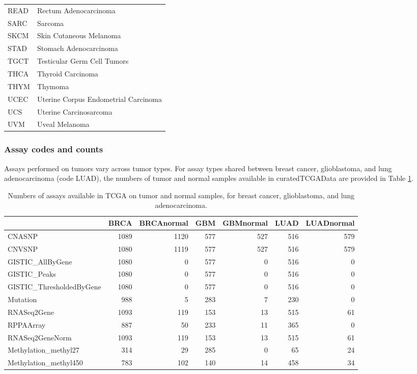 \documentclass[graybox]{svmult}
\begin{document}
\begin{table}
\begin{tabular}[t]{ll}
READ & Rectum Adenocarcinoma\\
SARC & Sarcoma\\
SKCM & Skin Cutaneous Melanoma\\
\addlinespace
STAD & Stomach Adenocarcinoma\\
TGCT & Testicular Germ Cell Tumors\\
THCA & Thyroid Carcinoma\\
THYM & Thymoma\\
UCEC & Uterine Corpus Endometrial Carcinoma\\
\addlinespace
UCS & Uterine Carcinosarcoma\\
UVM & Uveal Melanoma\\
\bottomrule
\end{tabular}
\end{table}


\subsubsection{Assay codes and counts}\label{assay-codes-and-counts}

Assays performed on tumors vary across tumor types. For assay
types shared between
breast cancer, glioblastoma, and lung adenocarcinoma (code LUAD),
the numbers of tumor and normal samples available in curatedTCGAData
are provided in Table \ref{tab:tab-doassc}.

\begin{table}

\caption{\label{tab:tab-doassc}Numbers of assays available in TCGA on tumor and normal samples,
for breast cancer, glioblastoma, and lung adenocarcinoma.}
\centering
\begin{tabular}[t]{lrrrrrr}
\toprule
  & BRCA & BRCAnormal & GBM & GBMnormal & LUAD & LUADnormal\\
\midrule
CNASNP & 1089 & 1120 & 577 & 527 & 516 & 579\\
CNVSNP & 1080 & 1119 & 577 & 527 & 516 & 579\\
GISTIC\_AllByGene & 1080 & 0 & 577 & 0 & 516 & 0\\
GISTIC\_Peaks & 1080 & 0 & 577 & 0 & 516 & 0\\
GISTIC\_ThresholdedByGene & 1080 & 0 & 577 & 0 & 516 & 0\\
\addlinespace
Mutation & 988 & 5 & 283 & 7 & 230 & 0\\
RNASeq2Gene & 1093 & 119 & 153 & 13 & 515 & 61\\
RPPAArray & 887 & 50 & 233 & 11 & 365 & 0\\
RNASeq2GeneNorm & 1093 & 119 & 153 & 13 & 515 & 61\\
Methylation\_methyl27 & 314 & 29 & 285 & 0 & 65 & 24\\
\addlinespace
Methylation\_methyl450 & 783 & 102 & 140 & 14 & 458 & 34\\
\bottomrule
\end{tabular}
\end{table}
\end{document}
